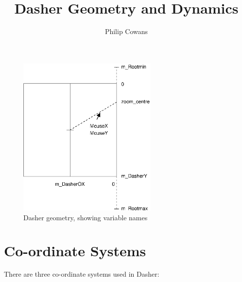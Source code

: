\documentclass{article}
\begin{document}
\title{Dasher Geometry and Dynamics}
\author{Philip Cowans}

\maketitle

\begin{figure}
\begin{center}
\includegraphics[height=8cm]{geometry}
\end{center}
\caption{Dasher geometry, showing variable names}
\label{geometry_fig}
\end{figure}

\section{Co-ordinate Systems}

There are three co-ordinate systems used in Dasher:
\end{document}

